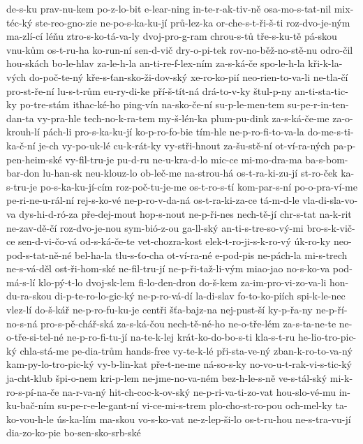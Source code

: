 de-s-ku
prav-nu-kem
po-z-lo-bit
e-lear-ning
in-te-r-ak-tiv-ně
osa-mo-s-tat-nil
mix-téc-ký
ste-reo-gno-zie
ne-po-s-ka-ku-jí
prů-lez-ka
or-che-s-t-ři-š-ti
roz-dvo-je-ným
ma-zlí-cí
léňu
ztro-s-ko-tá-va-ly
dvoj-pro-g-ram
chrou-s-tů
tře-s-ku-tě
pá-skou
vnu-kům
os-t-ru-ha
ko-run-ní
sen-d-vič
dry-o-pi-tek
rov-no-běž-no-stě-nu
odro-čil
hou-skách
bo-le-hlav
za-le-h-la
an-ti-re-f-lex-ním
za-s-ká-če
spo-le-h-la
kři-k-la-vých
do-poč-te-ný
kře-s-ťan-sko-ži-dov-ský
xe-ro-ko-pií
neo-rien-to-va-li
ne-tla-čí
pro-st-ře-ní
lu-s-t-rům
eu-ry-di-ke
pří-š-tít-ná
drá-to-v-ky
štul-p-ny
an-ti-sta-tic-ky
po-tre-stám
ithac-ké-ho
ping-vín
na-sko-če-ní
su-p-le-men-tem
su-pe-r-in-ten-dan-ta
vy-pra-hle
tech-no-k-ra-tem
my-š-lén-ka
plum-pu-dink
za-s-ká-če-me
za-o-krouh-lí
pách-li
pro-s-ka-ku-jí
ko-p-ro-fo-bie
tím-hle
ne-p-ro-fi-to-va-la
do-me-s-ti-ka-č-ní
je-ch
vy-po-uk-lé
cu-k-rát-ky
vy-stři-hnout
za-šu-stě-ní
ot-ví-ra-ných
pa-p-pen-heim-ské
vy-fil-tru-je
pu-d-ru
ne-u-kra-d-lo
mic-ce
mi-mo-dra-ma
ba-s-bom-bar-don
lu-han-sk
neu-klouz-lo
ob-leč-me
na-strou-há
os-t-ra-ki-zu-jí
st-ro-ček
ka-s-tru-je
po-s-ka-ku-jí-cím
roz-poč-tu-je-me
os-t-ro-s-tí
kom-par-s-ní
po-o-pra-ví-me
pe-ri-ne-u-rál-ní
rej-s-ko-vé
ne-p-ro-v-da-ná
os-t-ra-ki-za-ce
tá-m-d-le
vla-di-sla-vo-va
dys-hi-d-ró-za
pře-dej-mout
hop-s-nout
ne-p-ři-nes
nech-tě-jí
chr-s-tat
na-k-rit
ne-zav-dě-čí
roz-dvo-je-nou
sym-bió-z-ou
ga-ll-ský
an-ti-s-tre-so-vý-mi
bro-s-k-vič-ce
sen-d-vi-čo-vá
od-s-ká-če-te
vet-chozra-kost
elek-t-ro-ji-s-k-ro-vý
úk-ro-ky
neo-pod-s-tat-ně-né
bel-ha-la
tlu-s-ťo-cha
ot-ví-ra-né
e-pod-pis
ne-pách-la
mi-s-trech
ne-s-vá-děl
ost-ři-hom-ské
ne-fil-tru-jí
ne-p-ři-taž-li-vým
miao-jao
no-s-ko-va
pod-má-s-lí
klo-pý-t-lo
dvoj-sk-lem
fi-lo-den-dron
do-š-kem
za-im-pro-vi-zo-va-li
hon-du-ra-skou
di-p-te-ro-lo-gic-ký
ne-p-ro-vá-dí
la-di-slav
fo-to-ko-piích
spi-k-le-nec
vlez-lí
do-š-kář
ne-p-ro-fu-ku-je
centři
šťa-bajz-na
nej-pust-ší
ky-p-řa-ny
ne-p-ří-no-s-ná
pro-s-pě-chář-ská
za-s-ká-čou
nech-tě-né-ho
ne-o-tře-lém
za-s-ta-ne-te
ne-o-tře-si-tel-né
ne-p-ro-fi-tu-jí
na-te-k-lej
krát-ko-do-bo-s-ti
kla-s-t-ru
he-lio-tro-pic-ký
chla-stá-me
pe-dia-trům
hands-free
vy-te-k-lé
při-sta-ve-ný
zban-k-ro-to-va-ný
kam-py-lo-tro-pic-ký
vy-b-lin-kat
pře-t-ne-me
ná-so-s-ky
no-vo-u-t-rak-vi-s-tic-ký
ja-cht-klub
špi-o-nem
kri-p-lem
ne-jme-no-va-ném
bez-h-le-s-ně
ve-s-tál-ský
mi-k-ro-s-pí-na-če
na-r-va-ný
hit-ch-coc-k-ov-ský
ne-p-ri-va-ti-zo-vat
hou-slo-vé-mu
in-ku-bač-ním
su-pe-r-e-le-gant-ní
vi-ce-mi-s-trem
plo-cho-st-ro-pou
och-mel-ky
ta-ko-vou-h-le
ús-ka-lím
ma-skou
vo-s-ko-vat
ne-z-lep-ši-lo
os-t-ru-hou
ne-s-tra-vu-jí
dia-zo-ko-pie
bo-sen-sko-srb-ské
